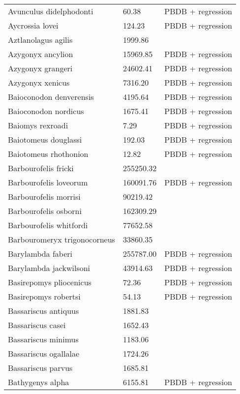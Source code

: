 \documentclass{article}
\begin{document}
\begin{center}
\begin{longtable}{p{} p{} p{}}
    Avunculus didelphodonti & 60.38 & PBDB + regression \\ 
    Aycrossia lovei & 124.23 & PBDB + regression \\ 
    Aztlanolagus agilis & 1999.86 & \cite{Smith2004} \\ 
    Azygonyx ancylion & 15969.85 & PBDB + regression \\ 
    Azygonyx grangeri & 24602.41 & PBDB + regression \\ 
    Azygonyx xenicus & 7316.20 & PBDB + regression \\ 
    Baioconodon denverensis & 4195.64 & PBDB + regression \\ 
    Baioconodon nordicus & 1675.41 & PBDB + regression \\ 
    Baiomys rexroadi & 7.29 & PBDB + regression \\ 
    Baiotomeus douglassi & 192.03 & PBDB + regression \\ 
    Baiotomeus rhothonion & 12.82 & PBDB + regression \\ 
    Barbourofelis fricki & 255250.32 & \cite{Tomiya2013} \\ 
    Barbourofelis loveorum & 160091.76 & PBDB + regression \\ 
    Barbourofelis morrisi & 90219.42 & \cite{Tomiya2013} \\ 
    Barbourofelis osborni & 162309.29 & \cite{Martin2002a} \\ 
    Barbourofelis whitfordi & 77652.58 & \cite{Tomiya2013} \\ 
    Barbouromeryx trigonocorneus & 33860.35 & \cite{Tomiya2013} \\ 
    Barylambda faberi & 255787.00 & PBDB + regression \\ 
    Barylambda jackwilsoni & 43914.63 & PBDB + regression \\ 
    Basirepomys pliocenicus & 72.36 & PBDB + regression \\ 
    Basirepomys robertsi & 54.13 & PBDB + regression \\ 
    Bassariscus antiquus & 1881.83 & \cite{Tomiya2013} \\ 
    Bassariscus casei & 1652.43 & \cite{Tomiya2013} \\ 
    Bassariscus minimus & 1183.06 & \cite{Robinson1966} \\ 
    Bassariscus ogallalae & 1724.26 & \cite{Gidley1920} \\ 
    Bassariscus parvus & 1685.81 & \cite{Tomiya2013} \\ 
    Bathygenys alpha & 6155.81 & PBDB + regression \\ 

\end{longtable}
\end{center}
\end{document}
